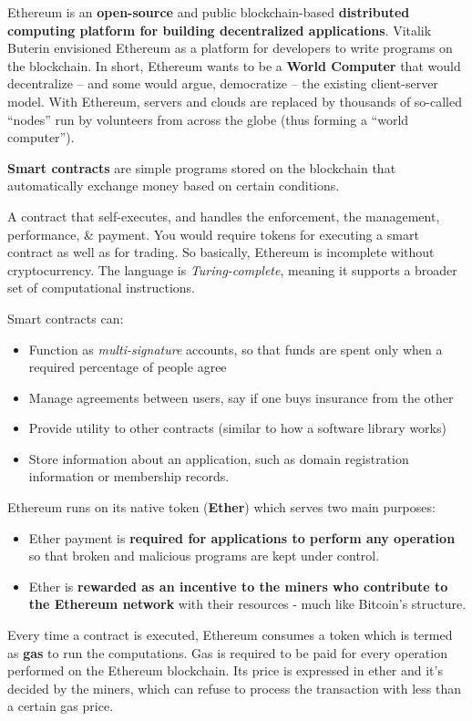 Ethereum is an \textbf{open-source} and public blockchain-based \textbf{distributed computing platform for building decentralized applications}. Vitalik Buterin envisioned Ethereum as a platform for developers to write programs on the blockchain. In short, Ethereum wants to be a \textbf{World Computer} that would decentralize – and some would argue, democratize – the existing client-server model. With Ethereum, servers and clouds are replaced by thousands of so-called ``nodes'' run by volunteers from across the globe (thus forming a ``world computer'').

\textbf{Smart contracts} are simple programs stored on the blockchain that automatically exchange money based on certain conditions.

A contract that self-executes, and handles the enforcement, the management, performance, \& payment. You would require tokens for executing a smart contract as well as for trading. So basically, Ethereum is incomplete without cryptocurrency. The language is \textit{Turing-complete}, meaning it supports a broader set of computational instructions.

Smart contracts can:
\begin{itemize}
	\item Function as \textit{multi-signature} accounts, so that funds are spent only when a required percentage of people agree
	\item Manage agreements between users, say if one buys insurance from the other
	\item Provide utility to other contracts (similar to how a software library works)
	\item Store information about an application, such as domain registration information or membership records.
\end{itemize}

Ethereum runs on its native token (\textbf{Ether}) which serves two main purposes:
\begin{itemize}
	\item Ether payment is \textbf{required for applications to perform any operation} so that broken and malicious programs are kept under control.
	\item Ether is \textbf{rewarded as an incentive to the miners who contribute to the Ethereum network} with their resources - much like Bitcoin’s structure.
\end{itemize}

Every time a contract is executed, Ethereum consumes a token which is termed as \textbf{gas} to run the computations. Gas is required to be paid for every operation performed on the Ethereum blockchain. Its price is expressed in ether and it’s decided by the miners, which can refuse to process the transaction with less than a certain gas price.

